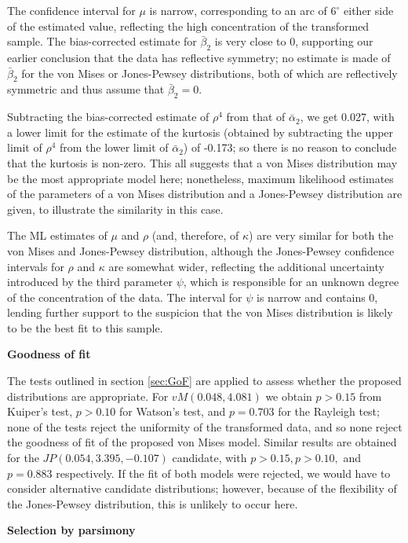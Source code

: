 \documentclass[../../ArchStats.tex]{subfiles}
\begin{document}
The confidence interval for $\mu$ is narrow, corresponding to an arc of $6^\circ$ either side of the estimated value, reflecting the high concentration of the transformed sample. The bias-corrected estimate for $\bar{\beta}_2$ is very close to 0, supporting our earlier conclusion that the data has reflective symmetry; no estimate is made of $\bar{\beta}_2$ for the von Mises or Jones-Pewsey distributions, both of which are reflectively symmetric and thus assume that $\bar{\beta}_2 = 0$. 

Subtracting the bias-corrected estimate of $\rho^4$ from that of $\bar{\alpha}_2$, we get 0.027, with a lower limit for the estimate of the kurtosis (obtained by subtracting the upper limit of $\rho^4$ from the lower limit of $\bar{\alpha}_2$) of -0.173; so there is no reason to conclude that the kurtosis is non-zero. This all suggests that a von Mises distribution may be the most appropriate model here; nonetheless, maximum likelihood estimates of the parameters of a von Mises distribution and a Jones-Pewsey distribution are given, to illustrate the similarity in this case.

The ML estimates of $\mu$ and $\rho$ (and, therefore, of $\kappa$) are very similar for both the von Mises and Jones-Pewsey distribution, although the Jones-Pewsey confidence intervals for $\rho$ and $\kappa$ are somewhat wider, reflecting the additional uncertainty introduced by the third parameter $\psi$, which is responsible for an unknown degree of the concentration of the data. The interval for $\psi$ is narrow and contains 0, lending further support to the suspicion that the von Mises distribution is likely to be the best fit to this sample.
    
\textbf{Goodness of fit}

The tests outlined in section \ref{sec:GoF} are applied to assess whether the proposed distributions are appropriate. For $vM(0.048, 4.081)$ we obtain $p > 0.15$ from Kuiper's test, $p > 0.10$ for Watson's test, and $p = 0.703$ for the Rayleigh test; none of the tests reject the uniformity of the transformed data, and so none reject the goodness of fit of the proposed von Mises model. Similar results are obtained for the $JP(0.054, 3.395, -0.107)$ candidate, with $p > 0.15, p > 0.10,$ and $p=0.883$ respectively. If the fit of both models were rejected, we would have to consider alternative candidate distributions; however, because of the flexibility of the Jones-Pewsey distribution, this is unlikely to occur here.

\textbf{Selection by parsimony}
\end{document}
